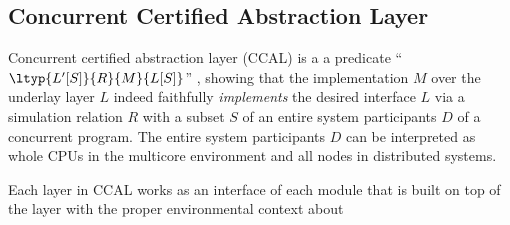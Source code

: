 %
%
%

\subsection{Concurrent Certified Abstraction Layer}

Concurrent certified abstraction layer (CCAL) is a a predicate 
``$\ltyp{L'[S]}{R}{M}{L[S]}$'' ,
showing that the implementation $M$ over the  underlay layer $L$ 
indeed faithfully {\em implements} the desired interface $L$ 
via a simulation relation $R$ with a subset $S$ of 
an entire system participants $D$ of a concurrent program. 
The entire system participants $D$ can be interpreted as 
whole CPUs in the multicore environment and all nodes in distributed systems.

Each layer in CCAL works as an interface of 
each module that is built on top of the layer with the proper environmental context 
about 

